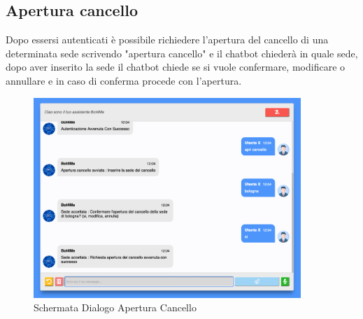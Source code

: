 \subsection{Apertura cancello}
Dopo essersi autenticati è possibile richiedere l'apertura del cancello di una determinata sede scrivendo "apertura cancello" e il chatbot chiederà in quale sede, dopo aver inserito la sede il chatbot chiede se si vuole confermare, modificare o annullare e in caso di conferma procede con l'apertura.

\begin{figure}[H]
    \centering\includegraphics[width=0.9\textwidth, height=0.7\textheight, keepaspectratio]{images/schermata_apertura_cancello.png}
    \caption{Schermata Dialogo Apertura Cancello}
\end{figure}